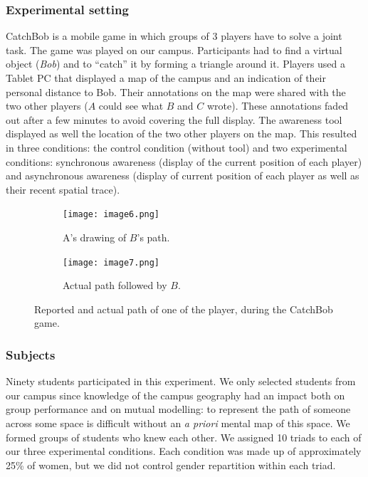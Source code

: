 \documentclass[natbib]{svjour3}
\begin{document}
\subsubsection*{Experimental setting}

{\sc CatchBob} is a mobile game in which groups of 3 players have to solve a
joint task. The game was played on our campus. Participants had to find a
virtual object (\emph{Bob}) and to ``catch'' it by forming a triangle around it.
Players used a Tablet PC that displayed a map of the campus and an indication of
their personal distance to Bob. Their annotations on the map were shared with
the two other players ($A$ could see what $B$ and $C$ wrote). These annotations
faded out after a few minutes to avoid covering the full display. The awareness
tool displayed as well the location of the two other players on the map. This
resulted in three conditions: the control condition (without tool) and two
experimental conditions: synchronous awareness (display of the current position
of each player) and asynchronous awareness (display of current position of each
player as well as their recent spatial trace).

\begin{figure}[h!t]
        \centering
        \begin{subfigure}{.45\textwidth}
            \texttt{[image: image6.png]}
            \caption{A's drawing of $B$'s path.}
        \end{subfigure}
        \begin{subfigure}{.4\textwidth}
            \texttt{[image: image7.png]}
            \caption{Actual path followed by $B$.}
        \end{subfigure}
        \caption{Reported and actual path of one of the player, during the {\sc
        CatchBob} game.}
        \label{study2:paths}
\end{figure}

\subsubsection*{Subjects}


Ninety students participated in this experiment. We only selected students from
our campus since knowledge of the campus geography had an impact both on group
performance and on mutual modelling: to represent the path of someone across
some space is difficult without an \textit{a priori} mental map of this space.
We formed groups of students who knew each other. We assigned 10 triads to each
of our three experimental conditions. Each condition was made up of
approximately 25\% of women, but we did not control gender repartition within
each triad.
\end{document}
